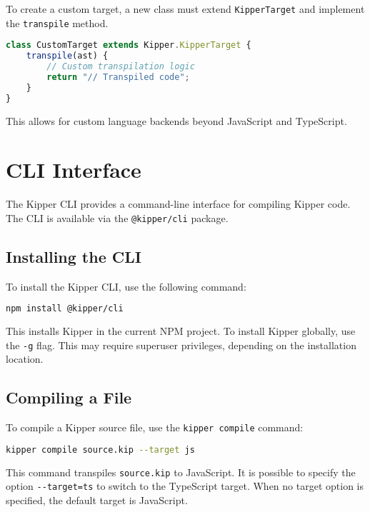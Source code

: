 To create a custom target, a new class must extend \lstinline|KipperTarget| and implement the \lstinline|transpile| method.

\begin{lstlisting}[language=Typescript, caption=Creating a Custom Compilation Target, label=lst:custom_target]
class CustomTarget extends Kipper.KipperTarget {
	transpile(ast) {
		// Custom transpilation logic
		return "// Transpiled code";
	}
}
\end{lstlisting}

This allows for custom language backends beyond JavaScript and TypeScript.

\section{CLI Interface}
\label{sec:cli_interface}

The Kipper CLI provides a command-line interface for compiling Kipper code. The CLI is available via the \lstinline|@kipper/cli| package.

\subsection{Installing the CLI}
\label{subsec:cli_installation}

To install the Kipper CLI, use the following command:

\begin{lstlisting}[language=bash, caption=Installing Kipper CLI, label=lst:cli_install]
npm install @kipper/cli
\end{lstlisting}

This installs Kipper in the current NPM project. To install Kipper globally, use the \lstinline|-g| flag. This may require superuser privileges, depending on the installation location.

\subsection{Compiling a File}
\label{subsec:cli_compile}

To compile a Kipper source file, use the \lstinline|kipper compile| command:

\begin{lstlisting}[language=bash, caption=Compiling a Kipper File, label=lst:cli_compile]
kipper compile source.kip --target js
\end{lstlisting}

This command transpiles \lstinline|source.kip| to JavaScript. It is possible to specify the option \lstinline|--target=ts| to switch to the TypeScript target. When no target option is specified, the default target is JavaScript.

